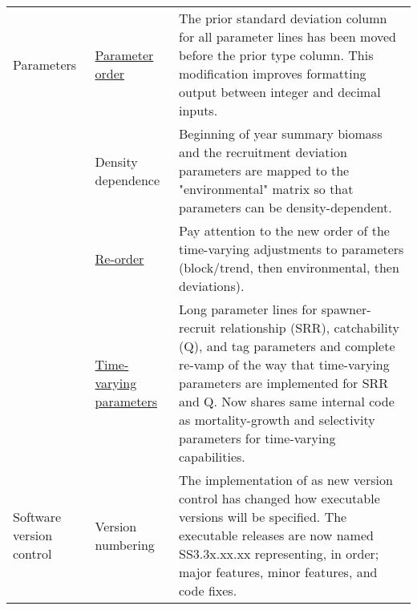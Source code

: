 \begin{center}
{\begin{longtable}{p{2cm} p{3cm} p{10cm}}
		Parameters 
			& \hyperlink{paraOrder}{Parameter order} & The prior standard deviation column for all parameter lines has been moved before the prior type column.  This modification improves formatting output between integer and decimal inputs.\\ 

			& Density dependence & 
				Beginning of year summary biomass and the recruitment deviation parameters are mapped to the "environmental" matrix so that parameters can be density-dependent.\\
				
			& \hyperlink{tvOrder}{Re-order} & 
				Pay attention to the new order of the time-varying adjustments to parameters (block/trend, then environmental, then deviations). \\
			
			& \hyperlink{time-vary}{Time-varying parameters} & 
				Long parameter lines for spawner-recruit relationship (SRR), catchability (Q), and tag parameters and complete re-vamp of the way that time-varying parameters are implemented for SRR and Q.  Now shares same internal code as mortality-growth and selectivity parameters for time-varying capabilities.\\

		 Software version control
			 & Version numbering	& The implementation of as new version control has changed how executable versions will be specified.  The executable releases are now named SS3.3x.xx.xx representing, in order; major features, minor features, and code fixes. \\
		 \hline
	\end{longtable}}
\end{center}
		

